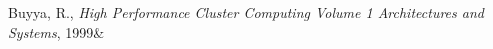 \begin{thebibliography}{9}

    Buyya, R.,
    \emph{High Performance Cluster Computing Volume 1 Architectures and Systems},
    1999\&


\end{thebibliography}

